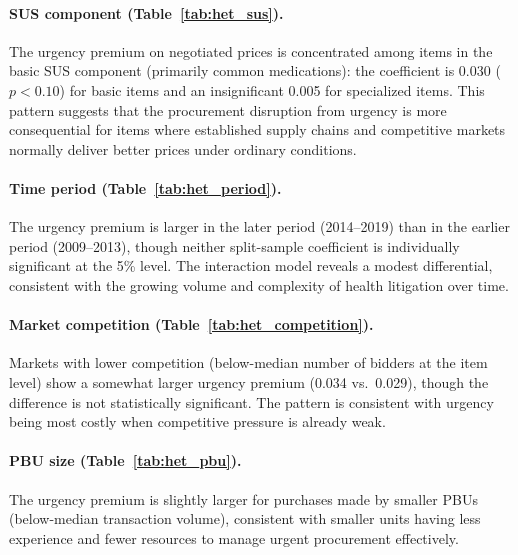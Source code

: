 




\paragraph{SUS component (Table~\ref{tab:het_sus}).}
The urgency premium on negotiated prices is concentrated among items in the basic SUS component (primarily common medications): the coefficient is 0.030 ($p < 0.10$) for basic items and an insignificant 0.005 for specialized items. This pattern suggests that the procurement disruption from urgency is more consequential for items where established supply chains and competitive markets normally deliver better prices under ordinary conditions.

\paragraph{Time period (Table~\ref{tab:het_period}).}
The urgency premium is larger in the later period (2014--2019) than in the earlier period (2009--2013), though neither split-sample coefficient is individually significant at the 5\% level. The interaction model reveals a modest differential, consistent with the growing volume and complexity of health litigation over time.

\paragraph{Market competition (Table~\ref{tab:het_competition}).}
Markets with lower competition (below-median number of bidders at the item level) show a somewhat larger urgency premium (0.034 vs.\ 0.029), though the difference is not statistically significant. The pattern is consistent with urgency being most costly when competitive pressure is already weak.

\paragraph{PBU size (Table~\ref{tab:het_pbu}).}
The urgency premium is slightly larger for purchases made by smaller PBUs (below-median transaction volume), consistent with smaller units having less experience and fewer resources to manage urgent procurement effectively.
